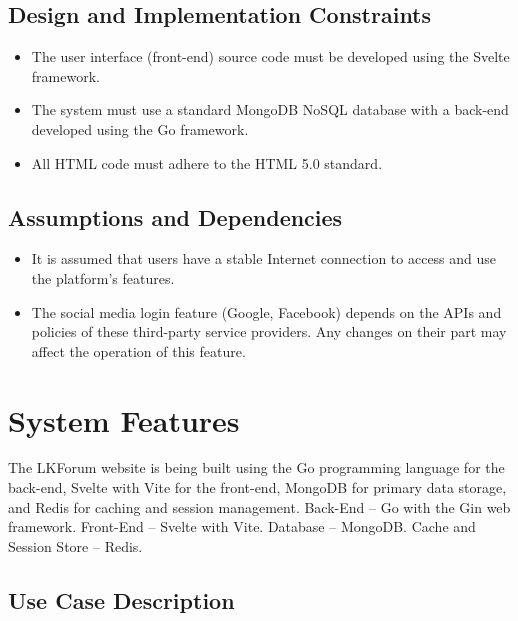 \documentclass{scrreprt}
\begin{document}
\section{Design and Implementation Constraints}

\begin{itemize}[leftmargin=2cm]
    \item[CO-1:] The user interface (front-end) source code must be developed using the Svelte framework.

    \item[CO-2:] The system must use a standard MongoDB NoSQL database with a back-end developed using the Go framework.

    \item[CO-3:] All HTML code must adhere to the HTML 5.0 standard.
\end{itemize}

\section{Assumptions and Dependencies}

\begin{itemize}[leftmargin=2cm]
    \item[AS-1:] It is assumed that users have a stable Internet connection to access and use the platform's features.

    \item[DE-1:] The social media login feature (Google, Facebook) depends on the APIs and policies of these third-party service providers. Any changes on their part may affect the operation of this feature.
\end{itemize}

\chapter{System Features}

The LKForum website is being built using the Go programming language for the back-end, Svelte with Vite for the front-end, MongoDB for primary data storage, and Redis for caching and session management.
\newline
Back-End -- Go with the Gin web framework.
\newline
Front-End -- Svelte with Vite.
\newline
Database -- MongoDB.
\newline
Cache and Session Store -- Redis.

\section{Use Case Description}
\end{document}
